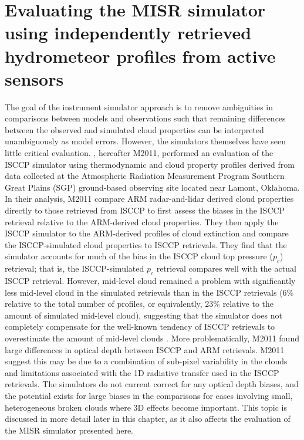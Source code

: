 \chapter{Evaluating the MISR simulator using independently retrieved
hydrometeor profiles from active sensors}\label{sec:misr}

The goal of the instrument simulator approach is to remove ambiguities
in comparisons between models and observations such that remaining
differences between the observed and simulated cloud properties can be
interpreted unambiguously as model errors. However, the simulators
themselves have seen little critical evaluation.
\citet{mace_et_al_2011}, hereafter M2011, performed an evaluation of the
ISCCP simulator using thermodynamic and cloud property profiles derived
from data collected at the Atmospheric Radiation Measurement Program
\citep[ARM;][]{ackerman_and_stokes_2003} Southern Great Plains (SGP)
ground-based observing site located near Lamont, Oklahoma. In their
analysis, M2011 compare ARM radar-and-lidar derived cloud properties
directly to those retrieved from ISCCP to first assess the biases in the
ISCCP retrieval relative to the ARM-derived cloud properties. They then
apply the ISCCP simulator to the ARM-derived profiles of cloud
extinction and compare the ISCCP-simulated cloud properties to ISCCP
retrievals. They find that the simulator accounts for much of the bias
in the ISCCP cloud top pressure (\(p_c\)) retrieval; that is, the
ISCCP-simulated \(p_c\) retrieval compares well with the actual ISCCP
retrieval. However, mid-level cloud remained a problem with
significantly less mid-level cloud in the simulated retrievals than in
the ISCCP retrievals (6\% relative to the total number of profiles, or
equivalently, 23\% relative to the amount of simulated mid-level cloud),
suggesting that the simulator does not completely compensate for the
well-known tendency of ISCCP retrievals to overestimate the amount of
mid-level clouds \citep[e.g.,][]{marchand_et_al_2010}. More
problematically, M2011 found large differences in optical depth between
ISCCP and ARM retrievals. M2011 suggest this may be due to a combination
of sub-pixel variability in the clouds and limitations associated with
the 1D radiative transfer used in the ISCCP retrievals. The simulators
do not current correct for any optical depth biases, and the potential
exists for large biases in the comparisons for cases involving small,
heterogeneous broken clouds where 3D effects become important. This
topic is discussed in more detail later in this chapter, as it also
affects the evaluation of the MISR simulator presented here.

